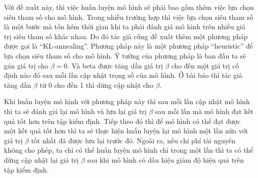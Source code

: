     Với đề xuất này, thì việc huấn luyện mô hình sẽ phải bao gồm thêm việc lựa chọn siêu tham số cho mô hình.
    Trong nhiều trường hợp thì việc lựa chọn siêu tham số là một bước mà tốn kém thời gian khi ta phải đánh giá mô hình trên nhiều giá trị siêu tham số khác nhau.  
    Do đó tác giả cũng đề xuất thêm một phương pháp được gọi là ``KL-annealing''.
    Phương pháp này là một phương pháp ``heuristic'' để lựa chọn siêu tham số cho mô hình.
    Ý tưởng của phương pháp là ban đầu ta sẽ gán giá trị cho $\beta =0$.
    Và beta được tăng dần giá trị $\beta$ cho đến một giá trị cố định nào đó sau mỗi lần cập nhật trọng số của mô hình.
    Ở bài báo \cite{mvae} thì tác giả tăng dần $\beta$ từ 0 cho đến 1 thì dừng cập nhật cho $\beta$.

    Khi huấn luyện mô hình với phương pháp này thì sau mỗi lần cập nhật mô hình thì ta sẽ đánh giá lại mô hình và lưu lại giá trị $\beta$ sau mỗi lần mà mô hình đạt kết quả tốt hơn trên tập kiểm định.
    Tiếp theo đó thì để mô hình có thể đạt được một kết quả tốt hơn thì ta sẽ thực hiện huấn luyện lại mô hình một lần nữa với giá trị $\beta$ tốt nhất đã được lưu lại trước đó.  Ngoài ra, nếu chi phí tài nguyên không cho phép, ta chỉ có thể huấn luyện mô hình chỉ trong một lần thì ta có thể dừng cập nhật lại giá trị $\beta$ sau khi mô hình có dấu hiệu giảm độ hiệu quả trên tập kiểm định. 
